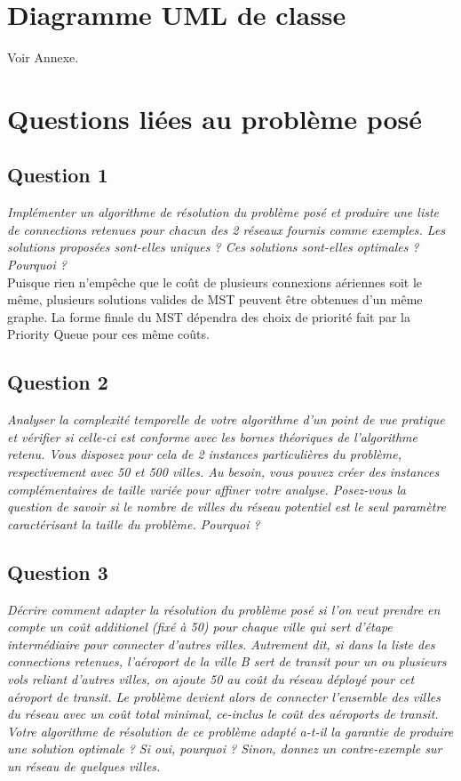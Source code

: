 \documentclass[11pt]{article}
\begin{document}
\section{Diagramme UML de classe}
Voir Annexe.

\section{Questions liées au problème posé}

\subsection*{Question 1}
\textit{Implémenter un algorithme de résolution du problème posé et produire une liste
de connections retenues pour chacun des 2 réseaux fournis comme exemples. Les
solutions proposées sont-elles uniques ? Ces solutions sont-elles optimales ? Pourquoi
?} \\



Puisque rien n'empêche que le coût de plusieurs connexions aériennes soit
le même, plusieurs solutions valides de MST peuvent être obtenues d'un même
graphe. La forme finale du MST dépendra des choix de priorité fait par la Priority Queue pour ces même coûts.

\subsection*{Question 2}
\textit{Analyser la complexité temporelle de votre algorithme d’un point de vue pratique
et vérifier si celle-ci est conforme avec les bornes théoriques de l’algorithme retenu.
Vous disposez pour cela de 2 instances particulières du problème, respectivement
avec 50 et 500 villes. Au besoin, vous pouvez créer des instances complémentaires
de taille variée pour affiner votre analyse. Posez-vous la question de
savoir si le nombre de villes du réseau potentiel est le seul paramètre caractérisant
la taille du problème. Pourquoi ?} \\



\subsection*{Question 3}
\textit{Décrire comment adapter la résolution du problème posé si l’on veut prendre en
compte un coût additionel (fixé à 50) pour chaque ville qui sert d’étape intermédiaire pour connecter d’autres villes. Autrement dit, si dans la liste des connections retenues, l’aéroport de la ville B sert de transit pour un ou plusieurs vols reliant d’autres villes, on ajoute 50 au coût du réseau déployé pour cet aéroport de transit. Le problème devient alors de connecter l’ensemble des villes du réseau avec un coût total minimal, ce-inclus le coût des aéroports de transit. Votre algorithme de résolution de ce problème adapté a-t-il la garantie de produire une solution optimale ? Si oui, pourquoi ? Sinon, donnez un contre-exemple sur un réseau de quelques villes.} \\
\end{document}
